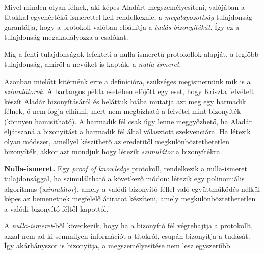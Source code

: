Mivel minden olyan félnek, aki képes Aladárt megszemélyesíteni, valójában a titokkal egyenértékű ismerettel kell rendelkeznie, a \textit{megalapozottság} tulajdonság garantálja, hogy a protokoll valóban előállítja a \textit{tudás bizonyítékát}. Így ez a tulajdonság megakadályozza a csalókat.

Míg a fenti tulajdonságok lefekteti a nulla-ismeretű protokollok alapját, a legfőbb tulajdonság, amiről a nevüket is kapták, a \textit{nulla-ismeret}.

Azonban mielőtt kitérnénk erre a definícióra, szükséges megismernünk mik is a \textit{szimulátorok}. A barlangos példa esetében előjött egy eset, hogy Kriszta felvételt készít Aladár bizonyításáról és beláttuk hiába mutatja azt meg egy harmadik félnek, ő nem fogja elhinni, mert nem megbízható a felvétel mint bizonyíték (könnyen hamisítható). A harmadik fél csak úgy lenne meggyőzhető, ha Aladár eljátszaná a bizonyítást a harmadik fél által választott szekvenciára. Ha létezik olyan módszer, amellyel készíthető az eredetitől megkülönböztethetetlen bizonyíték, akkor azt mondjuk hogy létezik \textit{szimulátor} a bizonyítékra.

\begin{definition}
    \textbf{Nulla-ismeret.} Egy \textit{proof of knowledge} protokoll, rendelkezik a nulla-ismeret tulajdonsággal, ha szimuláltható a következő módon: létezik egy polinomiális algoritmus (\textit{szimulátor}), amely a valódi bizonyító féllel való együttműködés nélkül képes az bemenetnek megfelelő átiratot készíteni, amely megkülönböztethetetlen a valódi bizonyító féltől kapottól.
\end{definition}

A \textit{nulla-ismeret}-ből következik, hogy ha a bizonyító fél végrehajtja a protokollt, azzal nem ad ki semmilyen információt a titokról, csupán bizonyítja a tudását. Így akárhányszor is bizonyítja, a megszemélyesítése nem lesz egyszerűbb.